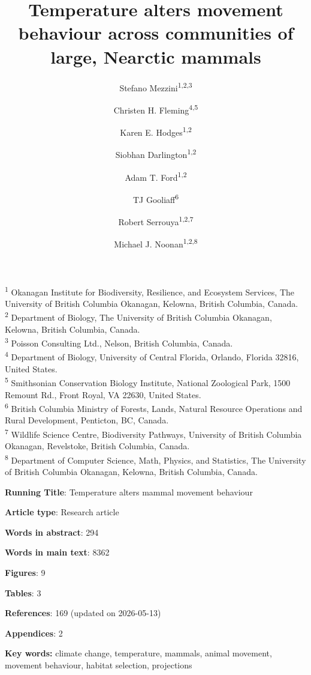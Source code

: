 \documentclass[
  12pt,
]{article}
\title{\Large Temperature alters movement behaviour across communities of large, Nearctic mammals}
\author{Stefano Mezzini\textsuperscript{1,2,3} \and Christen H. Fleming\textsuperscript{4,5} \and Karen E. Hodges\textsuperscript{1,2} \and Siobhan Darlington\textsuperscript{1,2} \and Adam T. Ford\textsuperscript{1,2} \and TJ Gooliaff\textsuperscript{6} \and Robert Serrouya\textsuperscript{1,2,7} \and Michael J. Noonan\textsuperscript{1,2,8}}
\date{}
\begin{document}
\maketitle

\textsuperscript{1} Okanagan Institute for Biodiversity, Resilience, and Ecosystem Services, The University of British Columbia Okanagan, Kelowna, British Columbia, Canada.\\
\textsuperscript{2} Department of Biology, The University of British Columbia Okanagan, Kelowna, British Columbia, Canada.\\
\textsuperscript{3} Poisson Consulting Ltd., Nelson, British Columbia, Canada.\\
\textsuperscript{4} Department of Biology, University of Central Florida, Orlando, Florida 32816, United States.\\
\textsuperscript{5} Smithsonian Conservation Biology Institute, National Zoological Park, 1500 Remount Rd., Front Royal, VA 22630, United States.\\
\textsuperscript{6} British Columbia Ministry of Forests, Lands, Natural Resource Operations and Rural Development, Penticton, BC, Canada.\\
\textsuperscript{7} Wildlife Science Centre, Biodiversity Pathways, University of British Columbia Okanagan, Revelstoke, British Columbia, Canada.\\
\textsuperscript{8} Department of Computer Science, Math, Physics, and Statistics, The University of British Columbia Okanagan, Kelowna, British Columbia, Canada.

\newpage

\clearpage

\noindent \textbf{Running Title}: Temperature alters mammal movement behaviour

\noindent \textbf{Article type}: Research article

\noindent \textbf{Words in abstract}: 294

\noindent \textbf{Words in main text}: 8362

\noindent \textbf{Figures}: 9

\noindent \textbf{Tables}: 3

\noindent \textbf{References}: 169 (updated on 2026-05-13)

\noindent \textbf{Appendices}: 2

\noindent \textbf{Key words:} climate change, temperature, mammals, animal movement, movement behaviour, habitat selection, projections
\end{document}

